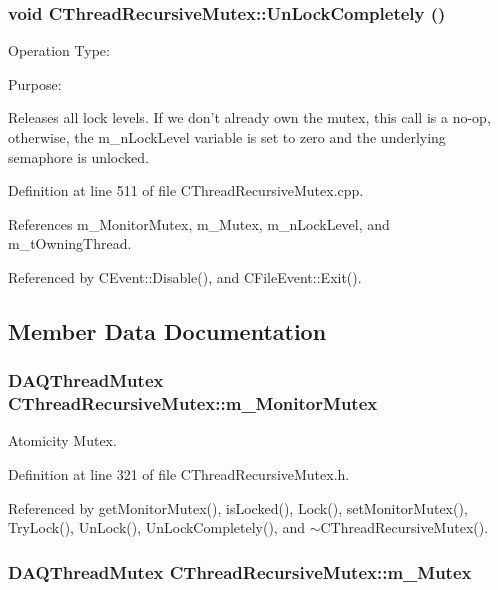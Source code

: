 \subsubsection{\setlength{\rightskip}{0pt plus 5cm}void CThread\-Recursive\-Mutex::Un\-Lock\-Completely ()}\label{classCThreadRecursiveMutex_a10}


Operation Type:

Purpose:

Releases all lock levels. If we don't  already own the mutex, this call is a no-op, otherwise, the m\_\-n\-Lock\-Level variable is set to zero and the underlying semaphore is unlocked. 

Definition at line 511 of file CThread\-Recursive\-Mutex.cpp.

References m\_\-Monitor\-Mutex, m\_\-Mutex, m\_\-n\-Lock\-Level, and m\_\-t\-Owning\-Thread.

Referenced by CEvent::Disable(), and CFile\-Event::Exit().

\subsection{Member Data Documentation}
\subsubsection{\setlength{\rightskip}{0pt plus 5cm}DAQThread\-Mutex CThread\-Recursive\-Mutex::m\_\-Monitor\-Mutex\hspace{0.3cm}{\tt  [private]}}\label{classCThreadRecursiveMutex_o3}


Atomicity Mutex.



Definition at line 321 of file CThread\-Recursive\-Mutex.h.

Referenced by get\-Monitor\-Mutex(), is\-Locked(), Lock(), set\-Monitor\-Mutex(), Try\-Lock(), Un\-Lock(), Un\-Lock\-Completely(), and $\sim$CThread\-Recursive\-Mutex().
\subsubsection{\setlength{\rightskip}{0pt plus 5cm}DAQThread\-Mutex CThread\-Recursive\-Mutex::m\_\-Mutex\hspace{0.3cm}{\tt  [private]}}\label{classCThreadRecursiveMutex_o0}


